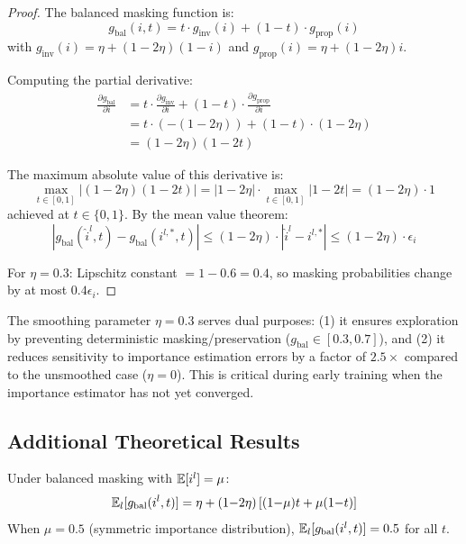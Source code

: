 \begin{proof}
The balanced masking function is:
\begin{equation}
    g_{\text{bal}}(i, t) = t \cdot g_{\text{inv}}(i) + (1{-}t) \cdot g_{\text{prop}}(i)
\end{equation}
with $g_{\text{inv}}(i) = \eta + (1{-}2\eta)(1{-}i)$ and $g_{\text{prop}}(i) = \eta + (1{-}2\eta)i$.

Computing the partial derivative:
\begin{align}
    \frac{\partial g_{\text{bal}}}{\partial i} &= t \cdot \frac{\partial g_{\text{inv}}}{\partial i} + (1{-}t) \cdot \frac{\partial g_{\text{prop}}}{\partial i} \\
    &= t \cdot (-(1{-}2\eta)) + (1{-}t) \cdot (1{-}2\eta) \\
    &= (1{-}2\eta)(1 - 2t)
\end{align}

The maximum absolute value of this derivative is:
\begin{equation}
    \max_{t \in [0,1]} |(1{-}2\eta)(1-2t)| = |1{-}2\eta| \cdot \max_{t \in [0,1]} |1-2t| = (1{-}2\eta) \cdot 1
\end{equation}
achieved at $t \in \{0, 1\}$. By the mean value theorem:
\begin{equation}
    |g_{\text{bal}}(\hat{i}^l, t) - g_{\text{bal}}(i^{l,*}, t)| \leq (1{-}2\eta) \cdot |\hat{i}^l - i^{l,*}| \leq (1{-}2\eta) \cdot \epsilon_i
\end{equation}

For $\eta = 0.3$: Lipschitz constant $= 1 - 0.6 = 0.4$, so masking probabilities change by at most $0.4 \epsilon_i$.
\end{proof}


The smoothing parameter $\eta = 0.3$ serves dual purposes: (1) it ensures exploration by preventing deterministic masking/preservation ($g_{\text{bal}} \in [0.3, 0.7]$), and (2) it reduces sensitivity to importance estimation errors by a factor of $2.5\times$ compared to the unsmoothed case ($\eta = 0$). This is critical during early training when the importance estimator has not yet converged.


\subsection{Additional Theoretical Results}

\begin{lemma}
\label{lem:conservation}
Under balanced masking with $\mathbb{E}[i^l] = \mu$:
\begin{equation}
    \mathbb{E}_l[g_{\text{bal}}(i^l, t)] = \eta + (1{-}2\eta)\left[(1{-}\mu)t + \mu(1{-}t)\right]
\end{equation}
When $\mu = 0.5$ (symmetric importance distribution), $\mathbb{E}_l[g_{\text{bal}}(i^l, t)] = 0.5$ for all $t$.
\end{lemma}

